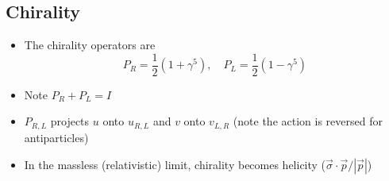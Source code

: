 \subsection{Chirality}
\begin{itemize}
  \item The chirality operators are
  \begin{equation}
    P_R = \frac{1}{2} \left(1+\gamma^5\right), \quad P_L = \frac{1}{2} \left(1-\gamma^5\right)
  \end{equation}
  \item Note $P_R+P_L = I$
  \item $P_{R,L}$ projects $u$ onto $u_{R,L}$ and $v$ onto $v_{L,R}$ (note the action is reversed for antiparticles)
  \item In the massless (relativistic) limit, chirality becomes helicity ($\vec\sigma \cdot \vec p / |\vec p|$)
\end{itemize}

